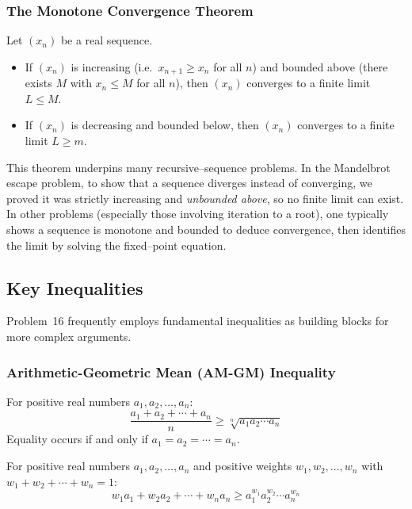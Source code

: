 \documentclass[12pt]{article}
\begin{document}
\subsubsection{The Monotone Convergence Theorem}
\begin{theorem}
Let $(x_n)$ be a real sequence.
\begin{itemize}[leftmargin=*]
  \item If $(x_n)$ is increasing (i.e.\ $x_{n+1} \ge x_n$ for all $n$) and bounded above (there exists $M$ with $x_n \le M$ for all $n$), then $(x_n)$ converges to a finite limit $L \le M$.
  \item If $(x_n)$ is decreasing and bounded below, then $(x_n)$ converges to a finite limit $L \ge m$.
\end{itemize}
\end{theorem}

\begin{remark}
This theorem underpins many recursive–sequence problems. In the Mandelbrot escape problem, to show that a sequence diverges instead of converging, we proved it was strictly increasing and \emph{unbounded above}, so no finite limit can exist. In other problems (especially those involving iteration to a root), one typically shows a sequence is monotone and bounded to deduce convergence, then identifies the limit by solving the fixed–point equation.
\end{remark}

\subsection{Key Inequalities}
Problem~16 frequently employs fundamental inequalities as building blocks for more complex arguments.

\subsubsection{Arithmetic-Geometric Mean (AM-GM) Inequality}
\begin{theorem}[AM-GM Inequality]
For positive real numbers $a_1, a_2, \ldots, a_n$:
\[\frac{a_1 + a_2 + \cdots + a_n}{n} \geq \sqrt[n]{a_1 a_2 \cdots a_n}\]
Equality occurs if and only if $a_1 = a_2 = \cdots = a_n$.
\end{theorem}

\begin{theorem}
For positive real numbers $a_1, a_2, \ldots, a_n$ and positive weights $w_1, w_2, \ldots, w_n$ with $w_1 + w_2 + \cdots + w_n = 1$:
\[w_1 a_1 + w_2 a_2 + \cdots + w_n a_n \geq a_1^{w_1} a_2^{w_2} \cdots a_n^{w_n}\]
\end{theorem}
\end{document}
